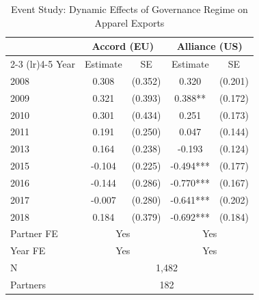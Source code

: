 \begin{table}[t]
\centering
\caption{Event Study: Dynamic Effects of Governance Regime on Apparel Exports}
\label{tab:eventstudy}
\begin{tabular}{lcccc}
\toprule
 & \multicolumn{2}{c}{Accord (EU)} & \multicolumn{2}{c}{Alliance (US)} \\
\cmidrule(lr){2-3} \cmidrule(lr){4-5}
Year & Estimate & SE & Estimate & SE \\
\midrule
2008 & 0.308 & (0.352) & 0.320 & (0.201) \\
2009 & 0.321 & (0.393) & 0.388** & (0.172) \\
2010 & 0.301 & (0.434) & 0.251 & (0.173) \\
2011 & 0.191 & (0.250) & 0.047 & (0.144) \\
2013 & 0.164 & (0.238) & -0.193 & (0.124) \\
2015 & -0.104 & (0.225) & -0.494*** & (0.177) \\
2016 & -0.144 & (0.286) & -0.770*** & (0.167) \\
2017 & -0.007 & (0.280) & -0.641*** & (0.202) \\
2018 & 0.184 & (0.379) & -0.692*** & (0.184) \\
\midrule
Partner FE & \multicolumn{2}{c}{Yes} & \multicolumn{2}{c}{Yes} \\
Year FE & \multicolumn{2}{c}{Yes} & \multicolumn{2}{c}{Yes} \\
N & \multicolumn{4}{c}{1,482} \\
Partners & \multicolumn{4}{c}{182} \\
\bottomrule
\end{tabular}
\par{}
\end{table}

